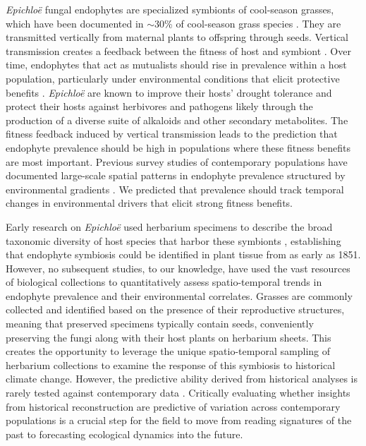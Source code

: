 \documentclass[11pt]{article}
\let\cite\citep
\newcommand{\revise}[1]{{\color{black}{#1}}}
\begin{document}
\emph{Epichloë} fungal endophytes are specialized symbionts of cool-season grasses, which have been documented in $\sim 30$\% of cool-season grass species \citep{leuchtmann1992systematics}.
They are \revise{predominantly} transmitted vertically from maternal plants to offspring through seeds.
Vertical transmission creates a feedback between the fitness of host and symbiont \citep{fine1975vectors, douglas1998host, rudgers2009fungus}. 
Over time, endophytes that act as mutualists should rise in prevalence within a host population, particularly under environmental conditions that elicit protective benefits \citep{donald2021context}. 
\emph{Epichloë} are known to improve their hosts' drought tolerance \cite{decunta2021systematic} and protect their hosts against herbivores \cite{crawford2010fungal} and pathogens \cite{xia2018role} likely through the production of a diverse suite of alkaloids and other secondary metabolites.
The fitness feedback induced by vertical transmission leads to the prediction that endophyte prevalence should be high in populations where these fitness benefits are most important. 
Previous survey studies of contemporary populations have documented large-scale spatial patterns in endophyte prevalence structured by environmental gradients \citep{granath2007variation,bazely2007broad, afkhami2012fungal,sneck2017variation}.
We predicted that prevalence should track temporal changes in environmental drivers \linelabel{R2C21-begin}\revise{(i.e. drought)}  that elicit strong fitness benefits.

Early research on \emph{Epichloë} used herbarium specimens to describe the broad taxonomic diversity of host species that harbor these symbionts \citep{white1985endophyte}, establishing that endophyte symbiosis could be identified in plant tissue from as early as 1851.
However, no subsequent studies, to our knowledge, have used the vast resources of biological collections to quantitatively assess spatio-temporal trends in endophyte prevalence and their environmental correlates. 
Grasses are commonly collected and identified based on the presence of their reproductive structures, meaning that preserved specimens typically contain seeds, conveniently preserving the fungi along with their host plants on herbarium sheets. 
This creates the opportunity to leverage the unique spatio-temporal sampling of herbarium collections to examine the response of this symbiosis to historical climate change. 
However, the predictive ability derived from historical analyses is rarely tested against contemporary data \citep{lee2024phenological}. 
Critically evaluating whether insights from historical reconstruction are predictive of variation across contemporary populations is a crucial step for the field to move from reading signatures of the past to forecasting ecological dynamics into the future.
\end{document}
